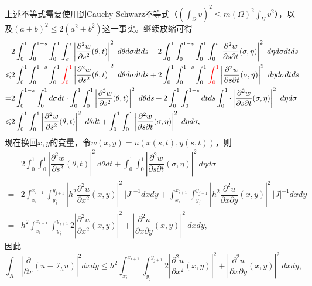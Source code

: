 \documentclass[a4paper,10pt]{ctexart}
\begin{document}
上述不等式需要使用到Cauchy-Schwarz不等式（$ (\int_\Omega v)^2\leqslant m(\Omega)^2 \int_U v^2 $），以及$ (a+b)^2\leqslant 2(a^2+b^2) $这一事实。继续放缩可得
\[
    \begin{aligned}
        &2\int_0^1 \int_0^{1-s}\int_0^1 \int_\sigma^s \left\vert \dfrac{\partial^2 w}{\partial {s}^2} (\theta,t) \right\vert^2\ d\theta d \sigma dt ds + 2\int_0^1 \int_0^{1-s}\int_0^1 \int_0^t \left\vert \dfrac{\partial^2 w}{\partial s \partial t} (\sigma,\eta) \right\vert^2\ d\eta d \sigma dt ds\\
        \leqslant & 2\int_0^1 \int_0^{1-s}\int_0^1 \textcolor{red}{\int_0^1} \left\vert \dfrac{\partial^2 w}{\partial {s}^2} (\theta,t) \right\vert^2\ d\theta d \sigma dt ds + 2\int_0^1 \int_0^{1-s}\int_0^1 \textcolor{red}{\int_0^1} \left\vert \dfrac{\partial^2 w}{\partial s \partial t} (\sigma,\eta) \right\vert^2\ d\eta d \sigma dt ds\\
        =& 2\int^{1-s}_0 \int_0^1 d \sigma dt\cdot \int_0^1\int_0^1 \left\vert \dfrac{\partial^2 w}{\partial {s}^2} (\theta,t) \right\vert^2\ d\theta ds + 2 \int_0^1\int^{1-s}_0 dtds \int_0^1 \cdot\left\vert \dfrac{\partial^2 w}{\partial s \partial t} (\sigma,\eta) \right\vert^2\ d\eta d \sigma\\
        \leqslant &2\int_0^1 \int_0^1 \left\vert \dfrac{\partial^2 w}{\partial {s}^2} (\theta,t) \right\vert^2\ d\theta dt + \int_0^1 \int_0^1 \left\vert \dfrac{\partial^2 w}{\partial s \partial t} (\sigma,\eta) \right\vert^2\ d\eta d \sigma,
    \end{aligned}
\]
现在换回$ x,y $的变量，令$ w(x,y) = u(x(s,t),y(s,t)) $，则
\[
    \begin{aligned}
        &2\int_0^1 \int_0^1 \left\vert \dfrac{\partial^2 w}{\partial {s}^2} (\theta,t) \right\vert^2\ d\theta dt + \int_0^1 \int_0^1 \left\vert \dfrac{\partial^2 w}{\partial s \partial t} (\sigma,\eta) \right\vert^2\ d\eta d \sigma\\
        =&2\int_{x_i}^{x_{i+1}} \int_{y_j}^{y_{j+1}} \left\vert h^2\dfrac{\partial^2 u}{\partial x^2} (x,y) \right\vert^2\ |J|^{-1}dxdy + \int_{x_i}^{x_{i+1}} \int_{y_j}^{y_{j+1}} \left\vert h^2\dfrac{\partial^2 u}{\partial x \partial y} (x,y) \right\vert^2\ |J|^{-1}dxdy\\
        =&h^2\int_{x_i}^{x_{i+1}} \int_{y_j}^{y_{j+1}} 2\left\vert \dfrac{\partial^2 u}{\partial x^2} (x,y) \right\vert^2 + \left\vert \dfrac{\partial^2 u}{\partial x \partial y} (x,y) \right\vert^2\ dxdy,
    \end{aligned}
\]
因此
\begin{equation}
    \int_K \left\vert \dfrac{\partial }{\partial x} (u-\mathcal{I}_h u) \right\vert^2 dxdy \leqslant h^2\int_{x_i}^{x_{i+1}} \int_{y_j}^{y_{j+1}} 2\left\vert \dfrac{\partial^2 u}{\partial x^2} (x,y) \right\vert^2 + \left\vert \dfrac{\partial^2 u}{\partial x \partial y} (x,y) \right\vert^2\ dxdy,
\end{equation}
\end{document}
